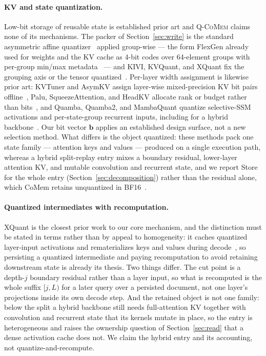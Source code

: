\documentclass{article}
\newcommand{\qcomem}{\textsc{Q-CoMem}}
\begin{document}
\paragraph{KV and state quantization.}
Low-bit storage of reusable state is established prior art and \qcomem{} claims
none of its mechanisms. The packer of Section~\ref{sec:write} is the standard
asymmetric affine quantizer~\citep{jacob2018quantization} applied group-wise ---
the form FlexGen already used for weights and the KV cache as 4-bit codes over
64-element groups with per-group min/max metadata~\citep{sheng2023flexgen} ---
and KIVI, KVQuant, and XQuant fix the grouping axis or the tensor
quantized~\citep{liu2024kivi,hooper2024kvquant,tomar2025xquant}. Per-layer width
assignment is likewise prior art: KVTuner and AsymKV assign layer-wise
mixed-precision KV bit pairs
offline~\citep{li2025kvtuner,tao2025asymkv,yang2024mikv}, Palu,
SqueezeAttention, and HeadKV allocate rank or budget rather than
bits~\citep{chang2025palu,wang2025squeezeattention,fu2025headkv}, and Quamba,
Quamba2, and MambaQuant quantize selective-SSM activations and per-state-group
recurrent inputs, including for a hybrid
backbone~\citep{chiang2025quamba,chiang2025quamba2,yue2025mambaquant}. Our bit
vector $\mathbf b$ applies an established design surface, not a new selection
method. What differs is the object quantized: these methods pack one state
family --- attention keys and values --- produced on a single execution path,
whereas a hybrid split-replay entry mixes a boundary residual, lower-layer
attention KV, and mutable convolution and recurrent state, and we report Store
for the whole entry (Section~\ref{sec:decomposition}) rather than the residual
alone, which CoMem retains unquantized in BF16~\citep{liu2026comem}.

\paragraph{Quantized intermediates with recomputation.}
XQuant is the closest prior work to our core mechanism, and the distinction must
be stated in terms rather than by appeal to homogeneity: it caches quantized
layer-input activations and rematerializes keys and values during
decode~\citep{tomar2025xquant}, so persisting a quantized intermediate and
paying recomputation to avoid retaining downstream state is already its thesis.
Two things differ.  The cut point is a depth-$j$ boundary residual rather than a
layer input, so what is recomputed is the whole suffix $[j,L)$ for a later query
over a persisted document, not one layer's projections inside its own decode
step.  And the retained object is not one family: below the split a hybrid
backbone still needs full-attention KV together with convolution and recurrent
state that its kernels mutate in place, so the entry is heterogeneous and raises
the ownership question of Section~\ref{sec:read} that a dense activation cache
does not.  We claim the hybrid entry and its accounting, not
quantize-and-recompute.
\end{document}
